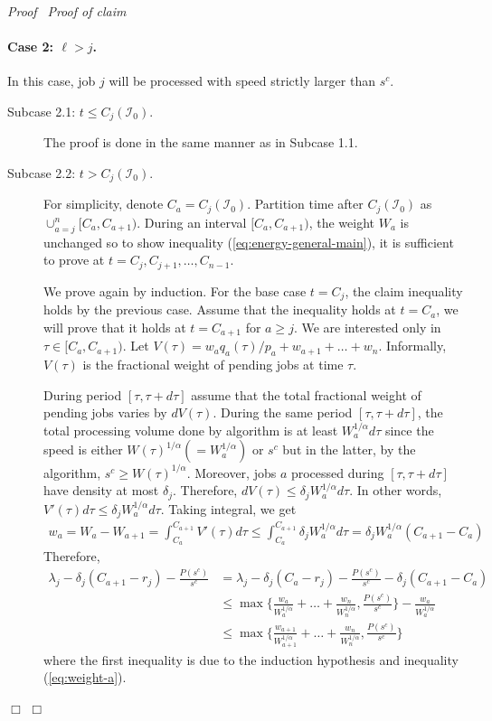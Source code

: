 \documentclass[11pt]{article}
\newenvironment{proof}{\noindent\emph{Proof\ }}{\hspace*{\fill}$\Box$\medskip}
\newenvironment{claimproof}{\noindent\emph{Proof of claim\ }}{\hspace*{\fill}$\Box$\medskip}
\begin{document}
\begin{proof}
\begin{claimproof}
\paragraph{Case 2: $\ell > j$.} In this case, job $j$ will be processed with speed strictly larger than $s^{c}$.
	\begin{description}
		\item[Subcase 2.1: $t \leq C_{j}(\mathcal{I}_{0})$.] The proof is done in the same manner as in Subcase 1.1.
\item[Subcase 2.2: $t > C_{j}(\mathcal{I}_{0})$.] 
		For simplicity, denote $C_{a} = C_{j}(\mathcal{I}_{0})$.
		Partition time after $C_{j}(\mathcal{I}_{0})$ as $\cup_{a = j}^{n} [C_{a}, C_{a+1})$.  
		During an interval $ [C_{a}, C_{a+1})$, the weight $W_{a}$ is unchanged so 
		to show inequality (\ref{eq:energy-general-main}), it is sufficient to prove 
		at $t = C_{j}, C_{j+1}, \ldots, C_{n-1}$. 
		
		We prove again by induction. For the base case $t = C_{j}$, the claim inequality holds
		by the previous case. Assume that the inequality holds at $t = C_{a}$, we will prove that 
		it holds at $t = C_{a+1}$ for $a \geq j$. We are interested only in $\tau \in [C_{a},C_{a+1})$.
		Let $V(\tau) = w_{a} q_{a}(\tau)/p_{a} + w_{a+1} + \ldots + w_{n}$. Informally, $V(\tau)$ is the fractional
		weight of pending jobs at time $\tau$. 
		
		During period $[\tau,\tau+d\tau]$ assume that the total fractional weight of pending jobs 
		varies by $dV(\tau)$. During the same period $[\tau,\tau+d\tau]$,
		the total processing volume done by algorithm is at least
		$W_{a}^{1/\alpha}d\tau$ since the speed is either $W(\tau)^{1/\alpha} (= W_{a}^{1/\alpha})$ or 
		$s^{c}$ but in the latter, by the algorithm, $s^{c} \geq W(\tau)^{1/\alpha}$.
		Moreover, jobs $a$ processed during $[\tau,\tau+d\tau]$ have density at most $\delta_{j}$.
		Therefore, $dV(\tau) \leq  \delta_{j} W_{a}^{1/\alpha}d\tau$. In other words,
		$V'(\tau)d\tau \leq \delta_{j}W_{a}^{1/\alpha}d\tau$. Taking integral, we get   
		\begin{align}	\label{eq:weight-a}
		w_{a} = W_{a} - W_{a+1} = \int_{C_{a}}^{C_{a+1}} V'(\tau)d\tau 
			\leq \int_{C_{a}}^{C_{a+1}} \delta_{j} W_{a}^{1/\alpha}d\tau
			= \delta_{j} W_{a}^{1/\alpha} (C_{a+1} - C_{a})
		\end{align}
		Therefore, 
		\begin{align*}
			\lambda_{j} - \delta_{j} (C_{a+1}-r_{j}) - \frac{P(s^{c})}{s^{c}}
				&= \lambda_{j} - \delta_{j} (C_{a}-r_{j}) - \frac{P(s^{c})}{s^{c}} -  \delta_{j} (C_{a+1}-C_{a}) \\
&\leq \max \biggl \{ \frac{w_{a}}{W_{a}^{1/\alpha}} + \ldots + \frac{w_{n}}{W_{n}^{1/\alpha}} 
								,\frac{P(s^{c})}{s^{c}} \biggl \} 
						- \frac{w_{a}}{W_{a}^{1/\alpha}} \\
&\leq \max \biggl \{ \frac{w_{a+1}}{W_{a+1}^{1/\alpha}} + \ldots + \frac{w_{n}}{W_{n}^{1/\alpha}}
								,\frac{P(s^{c})}{s^{c}} \biggl \} 
		\end{align*}
		where the first inequality is due to the induction hypothesis and inequality (\ref{eq:weight-a}).	




\end{description}
\end{claimproof}
\end{proof}
\end{document}
